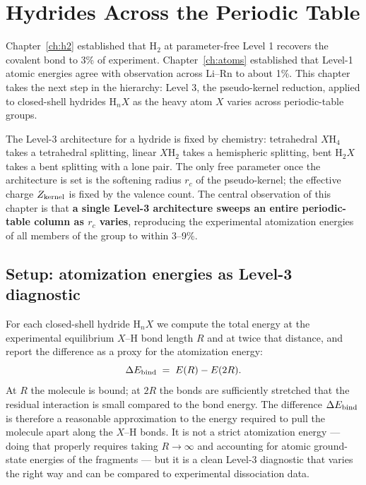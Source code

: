 \chapter{Hydrides Across the Periodic Table}\label{ch:hydrides}

Chapter~\ref{ch:h2} established that H$_2$ at parameter-free Level 1 recovers the covalent bond to 3\% of experiment. Chapter~\ref{ch:atoms} established that Level-1 atomic energies agree with observation across Li--Rn to about 1\%. This chapter takes the next step in the hierarchy: Level 3, the pseudo-kernel reduction, applied to closed-shell hydrides $\text{H}_n X$ as the heavy atom $X$ varies across periodic-table groups.

The Level-3 architecture for a hydride is fixed by chemistry: tetrahedral $X\text{H}_4$ takes a tetrahedral splitting, linear $X\text{H}_2$ takes a hemispheric splitting, bent $\text{H}_2 X$ takes a bent splitting with a lone pair. The only free parameter once the architecture is set is the softening radius $r_c$ of the pseudo-kernel; the effective charge $Z_{\rm kernel}$ is fixed by the valence count. The central observation of this chapter is that \textbf{a single Level-3 architecture sweeps an entire periodic-table column as $r_c$ varies}, reproducing the experimental atomization energies of all members of the group to within 3--9\%.

\section{Setup: atomization energies as Level-3 diagnostic}\label{sec:hydride-setup}

For each closed-shell hydride $\text{H}_n X$ we compute the total energy at the experimental equilibrium $X$--H bond length $R$ and at twice that distance, and report the difference as a proxy for the atomization energy:
\[
\Delta E_{\rm bind} \;=\; E(R) - E(2R).
\]
At $R$ the molecule is bound; at $2R$ the bonds are sufficiently stretched that the residual interaction is small compared to the bond energy. The difference $\Delta E_{\rm bind}$ is therefore a reasonable approximation to the energy required to pull the molecule apart along the $X$--H bonds. It is not a strict atomization energy --- doing that properly requires taking $R \to \infty$ and accounting for atomic ground-state energies of the fragments --- but it is a clean Level-3 diagnostic that varies the right way and can be compared to experimental dissociation data.

